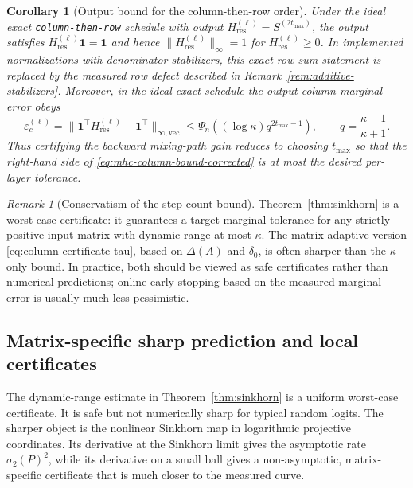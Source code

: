 \documentclass[11pt]{article}
\numberwithin{equation}{section}
\theoremstyle{plain}
\newtheorem{corollary}[theorem]{Corollary}
\theoremstyle{definition}
\theoremstyle{remark}
\newtheorem{remark}[theorem]{Remark}
\newcommand{\ones}{\mathbf{1}}
\newcommand{\Hres}{H_{\mathrm{res}}}
\begin{document}
\begin{corollary}[Output bound for the column-then-row order]
Under the ideal exact \texttt{column-then-row} schedule with output $\Hres^{(\ell)}=S^{(2t_{\max})}$, the output satisfies $\Hres^{(\ell)}\ones=\ones$ and hence $\|\Hres^{(\ell)}\|_\infty=1$ for $\Hres^{(\ell)}\ge0$. In implemented normalizations with denominator stabilizers, this exact row-sum statement is replaced by the measured row defect described in Remark~\ref{rem:additive-stabilizers}. Moreover, in the ideal exact schedule the output column-marginal error obeys
\begin{equation}\label{eq:mhc-column-bound-corrected}
\varepsilon_c^{(\ell)}
=
\big\|\ones^\top\Hres^{(\ell)}-\ones^\top\big\|_{\infty,\mathrm{vec}}
\le
\Psi_n\!\left((\log\kappa)q^{2t_{\max}-1}\right),
\qquad
q=\frac{\kappa-1}{\kappa+1}.
\end{equation}
Thus certifying the backward mixing-path gain reduces to choosing $t_{\max}$ so that the right-hand side of \eqref{eq:mhc-column-bound-corrected} is at most the desired per-layer tolerance.
\end{corollary}

\begin{remark}[Conservatism of the step-count bound]\label{rem:tmax_conservative}
Theorem~\ref{thm:sinkhorn} is a worst-case certificate: it guarantees a target marginal tolerance for any strictly positive input matrix with dynamic range at most $\kappa$. The matrix-adaptive version \eqref{eq:column-certificate-tau}, based on $\Delta(A)$ and $\delta_0$, is often sharper than the $\kappa$-only bound. In practice, both should be viewed as safe certificates rather than numerical predictions; online early stopping based on the measured marginal error is usually much less pessimistic.
\end{remark}


\subsection{Matrix-specific sharp prediction and local certificates}\label{subsec:local-spectral}

The dynamic-range estimate in Theorem~\ref{thm:sinkhorn} is a uniform worst-case certificate. It is safe but not numerically sharp for typical random logits. The sharper object is the nonlinear Sinkhorn map in logarithmic projective coordinates. Its derivative at the Sinkhorn limit gives the asymptotic rate $\sigma_2(P)^2$, while its derivative on a small ball gives a non-asymptotic, matrix-specific certificate that is much closer to the measured curve.
\end{document}
